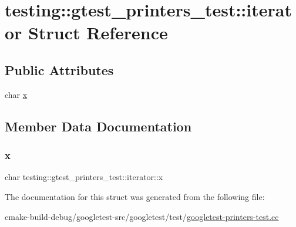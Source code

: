 \hypertarget{structtesting_1_1gtest__printers__test_1_1iterator}{}\section{testing\+::gtest\+\_\+printers\+\_\+test\+::iterator Struct Reference}
\label{structtesting_1_1gtest__printers__test_1_1iterator}
\subsection*{Public Attributes}
\begin{DoxyCompactItemize}
\item 
char \mbox{\hyperlink{structtesting_1_1gtest__printers__test_1_1iterator_a3d4d056077d3b3869259bdfd60a0778f}{x}}
\end{DoxyCompactItemize}


\subsection{Member Data Documentation}
\mbox{\label{structtesting_1_1gtest__printers__test_1_1iterator_a3d4d056077d3b3869259bdfd60a0778f}} 
\subsubsection{\texorpdfstring{x}{x}}
{\footnotesize\ttfamily char testing\+::gtest\+\_\+printers\+\_\+test\+::iterator\+::x}



The documentation for this struct was generated from the following file\+:\begin{DoxyCompactItemize}
\item 
cmake-\/build-\/debug/googletest-\/src/googletest/test/\mbox{\hyperlink{googletest-printers-test_8cc}{googletest-\/printers-\/test.\+cc}}\end{DoxyCompactItemize}
